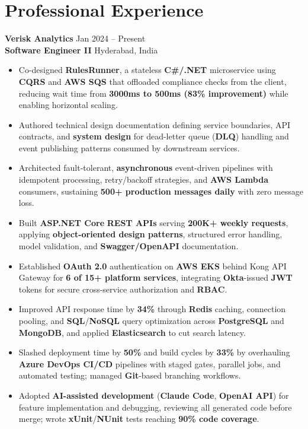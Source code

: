 \documentclass[a4paper,10pt]{article}
\begin{document}
\section*{Professional Experience}

\textbf{Verisk Analytics} \hfill Jan 2024 -- Present \\
\textbf{Software Engineer II} \hfill Hyderabad, India

\begin{itemize}[leftmargin=*]
    \item Co-designed \textbf{RulesRunner}, a stateless \textbf{C\#/.NET} microservice using \textbf{CQRS} and \textbf{AWS SQS} that offloaded compliance checks from the client, reducing wait time from \textbf{3000ms to 500ms (83\% improvement)} while enabling horizontal scaling.
    \item Authored technical design documentation defining service boundaries, API contracts, and \textbf{system design} for dead-letter queue (\textbf{DLQ}) handling and event publishing patterns consumed by downstream services.
    \item Architected fault-tolerant, \textbf{asynchronous} event-driven pipelines with idempotent processing, retry/backoff strategies, and \textbf{AWS Lambda} consumers, sustaining \textbf{500+ production messages daily} with zero message loss.
    \item Built \textbf{ASP.NET Core} \textbf{REST APIs} serving \textbf{200K+ weekly requests}, applying \textbf{object-oriented design patterns}, structured error handling, model validation, and \textbf{Swagger/OpenAPI} documentation.
    \item Established \textbf{OAuth 2.0} authentication on \textbf{AWS EKS} behind Kong API Gateway for \textbf{6 of 15+ platform services}, integrating \textbf{Okta}-issued \textbf{JWT} tokens for secure cross-service authorization and \textbf{RBAC}.
    \item Improved API response time by \textbf{34\%} through \textbf{Redis} caching, connection pooling, and \textbf{SQL}/\textbf{NoSQL} query optimization across \textbf{PostgreSQL} and \textbf{MongoDB}, and applied \textbf{Elasticsearch} to cut search latency.
    \item Slashed deployment time by \textbf{50\%} and build cycles by \textbf{33\%} by overhauling \textbf{Azure DevOps CI/CD} pipelines with staged gates, parallel jobs, and automated testing; managed \textbf{Git}-based branching workflows.
    \item Adopted \textbf{AI-assisted development} (\textbf{Claude Code}, \textbf{OpenAI API}) for feature implementation and debugging, reviewing all generated code before merge; wrote \textbf{xUnit}/\textbf{NUnit} tests reaching \textbf{90\% code coverage}.
\end{itemize}
\end{document}
